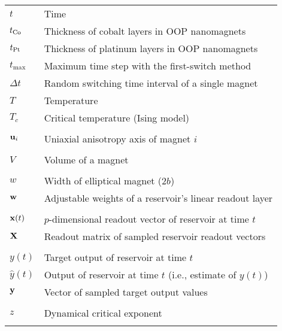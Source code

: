 \begin{longtable}[l]{p{60pt} p{350pt}}
	$t$ & Time \\
	$t_{\ce{Co}}$ & Thickness of cobalt layers in OOP nanomagnets \\
	$t_{\ce{Pt}}$ & Thickness of platinum layers in OOP nanomagnets \\
	$t_\mathrm{max}$ & Maximum time step with the first-switch method \\
	$\Delta t$ & Random switching time interval of a single magnet \\
	$T$ & Temperature \\
	$T_c$ & Critical temperature (Ising model) \\
	&\\

	$\boldsymbol{\mathbf{u}}_i$ & Uniaxial anisotropy axis of magnet $i$ \\
	&\\

	$V$ & Volume of a magnet \\
	&\\

	$w$ & Width of elliptical magnet ($2b$) \\
	$\boldsymbol{\mathbf{w}}$ & Adjustable weights of a reservoir's linear readout layer \\
	&\\
	
	$\boldsymbol{\mathbf{x}}(t)$ & $p$-dimensional readout vector of reservoir at time $t$ \\
	$\boldsymbol{\mathbf{X}}$ & Readout matrix of sampled reservoir readout vectors \\
	&\\
	
	$y(t)$ & Target output of reservoir at time $t$ \\
	$\hat{y}(t)$ & Output of reservoir at time $t$ (i.e., estimate of $y(t)$) \\
	$\boldsymbol{\mathbf{y}}$ & Vector of sampled target output values \\
	&\\
	
	$z$ & Dynamical critical exponent \\
	&\\
\end{longtable}

